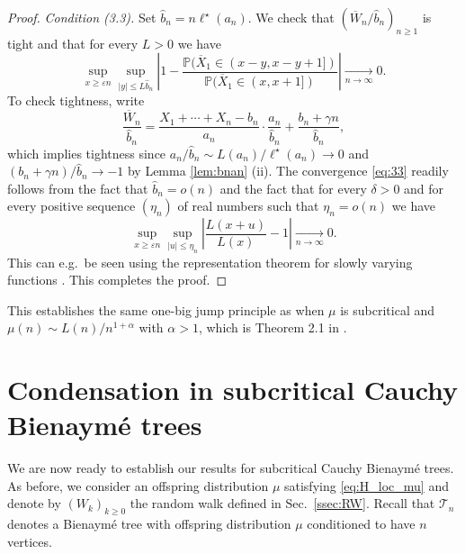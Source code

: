 \documentclass[a4paper,11pt]{article}
\DeclareRobustCommand{\P}{\mathbb{P}}
\DeclareRobustCommand{\to}{\xrightarrow[n\rightarrow \infty]{}}
\begin{document}
\begin{proof}
\emph{Condition (3.3).} Set $\widehat{b}_{n}= n \ell^{\star}(a_{n})$. We check that $(\overline{W}_{n}/\widehat{b}_{n})_{n \geq 1}$ is tight and that for every $L>0$ we have
\begin{equation}
\label{eq:33} \sup_{x \geq \varepsilon n} \sup_{|y| \leq L \widehat{b}_{n}} \left| 1- \frac{\P(\overline{X}_{1} \in (x-y,x-y+1])}{\P(\overline{X}_{1} \in (x,x+1])} \right| \to 0.
\end{equation}
To check tightness, write
$$ \frac{\overline{W}_{n}}{\widehat{b}_{n}} = \frac{X_{1}+ \cdots+X_{n}-b_{n}}{a_{n}} \cdot \frac{a_{n}}{\widehat{b}_{n}}+ \frac{b_{n}+\gamma n}{\widehat{b}_{n}},$$
which implies tightness since $a_{n}/\widehat{b}_{n} \sim L(a_{n})/\ell^{\star}(a_{n}) \rightarrow 0$ and $ ({b_{n}+\gamma n})/{\widehat{b}_{n}} \rightarrow -1$ by Lemma \ref{lem:bnan} (ii). 
The convergence \eqref{eq:33} readily follows from the fact that $\widehat{b}_{n}=o(n)$ and the fact that for every $\delta>0$ and for every positive sequence $(\eta_{n})$ of real numbers such that $\eta_{n}=o(n)$ we have
$$\sup_{x \geq \varepsilon n} \sup_{|u| \leq \eta_{n}} \left| \frac{L(x+u)}{L(x)}-1\right|\to 0.$$
This can e.g.~be seen using the representation theorem for slowly varying functions \cite[Theorem 1.3.1]{Bingham_Goldie_Teugels_1987}. This completes the proof.
\end{proof}            


This establishes the same one-big jump principle as when $\mu$ is subcritical and $\mu(n) \sim L(n)/n^{1+\alpha}$ with $\alpha>1$, which is  Theorem 2.1 in \cite{Kortchemski_2013}.


\section{Condensation in subcritical Cauchy Bienaymé trees}
\label{sec:condensation}

We are now ready to establish our results for subcritical Cauchy Bienaymé trees.    As before, we consider an offspring distribution $\mu$ satisfying \eqref{eq:H_loc_mu} and denote by  $(W_{k})_{k \geq 0}$   the random walk defined in Sec.~\ref{ssec:RW}. Recall that $ \mathcal{T}_{n}$ denotes a Bienaymé tree with offspring distribution $\mu$ conditioned to have $n$ vertices.
\end{document}
